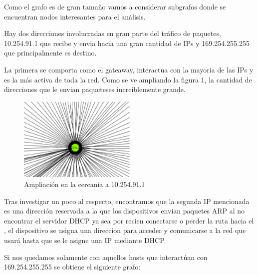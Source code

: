 		\par Como el grafo es de gran tamaño vamos a considerar subgrafos donde se encuentran nodos interesantes para el análisis.

	\par Hay dos direcciones involucradas en gran parte del tráfico de paquetes, 10.254.91.1 que  recibe y envia hacia una gran cantidad de IPs y 169.254.255.255 que principalmente es destino.

	\par La primera se comporta como el gateaway, interactua con la mayoria de las IPs y es la más activa de toda la red.   Como se ve ampliando la figura 1, la cantidad de direcciones que le envian paqueteses increiblemente grande.


\begin{figure}[!htb]
		\centering
		\includegraphics[width=0.5\textwidth]{img/graph/escenario_3/10254.eps}
		\caption{Ampliación en la cercan\'ia a 10.254.91.1}
		\label{fig:gateway_escenario3}
\end{figure}
\par Tras investigar un poco al respecto, encontramos que la segunda IP mencionada es una dirección reservada  a la que los dispositivos envian paquetes ARP al no encontrar el servidor DHCP ya sea por recien conectarse o perder la ruta hacia el , el dispositivo se asigna una direccion para acceder y comunicarse a la red que usará hasta que se le asigne una IP mediante DHCP\cite{rfc3927}.
	\par Si nos quedamos solamente con aquellos hosts que interactúan con 169.254.255.255 se obtiene el siguiente grafo:   


